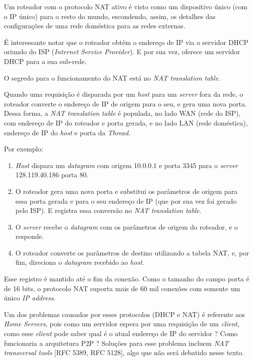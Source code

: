 Um roteador com o protocolo NAT ativo é visto como um dispositivo único
(com o IP único) para o resto do mundo, escondendo, assim, os detalhes
das configurações de uma rede doméstica para as redes externas.

É interessante notar que o roteador obtém o endereço de IP via o
servidor DHCP oriundo do ISP (\emph{Internet Service Provider}). E por
sua vez, oferece um servidor DHCP para a sua sub-rede.

O segredo para o funcionamento do NAT está no \emph{NAT translation
table}.

Quando uma requisição é disparada por um \emph{host} para um
\emph{server} fora da rede, o roteador converte o endereço de IP de
origem para o seu, e gera uma nova porta. Dessa forma, a \emph{NAT
translation table} é populada, no lado WAN (rede do ISP), com endereço
de IP do roteador e porta gerada, e no lado LAN (rede doméstica),
endereço de IP do \emph{host} e porta da \emph{Thread}.

Por exemplo:

\begin{enumerate}
\def\labelenumi{\arabic{enumi}.}
\tightlist
\item
  \emph{Host} dispara um \emph{datagram} com origem 10.0.0.1 e porta
  3345 para o \emph{server} 128.119.40.186 porta 80.
\item
  O roteador gera uma nova porta e substitui os parâmetros de origem
  para essa porta gerada e para o seu endereço de IP (que por sua vez
  foi gerado pelo ISP). E registra essa conversão no \emph{NAT
  translation table}.
\item
  O \emph{server} recebe o \emph{datagram} com os parâmetros de origem
  do roteador, e o responde.
\item
  O roteador converte os parâmetros de destino utilizando a tabela NAT,
  e, por fim, direciona o \emph{datagram} recebido ao \emph{host}.
\end{enumerate}

Esse registro é mantido até o fim da conexão. Como o tamanho do campo
porta é de 16 bits, o protocolo NAT suporta mais de 60 mil conexões com
somente um único \emph{IP address}.

Um dos problemas causados por esses protocolos (DHCP e NAT) é referente
aos \emph{Home Servers}, pois como um servidor espera por uma requisição
de um \emph{client}, como esse \emph{client} pode saber qual é o atual
endereço de IP do servidor ? Como funcionaria a arquitetura P2P ?
Soluções para esse problema incluem \emph{NAT transversal tools} {[}RFC
5389, RFC 5128{]}, algo que não será debatido nesse texto.

